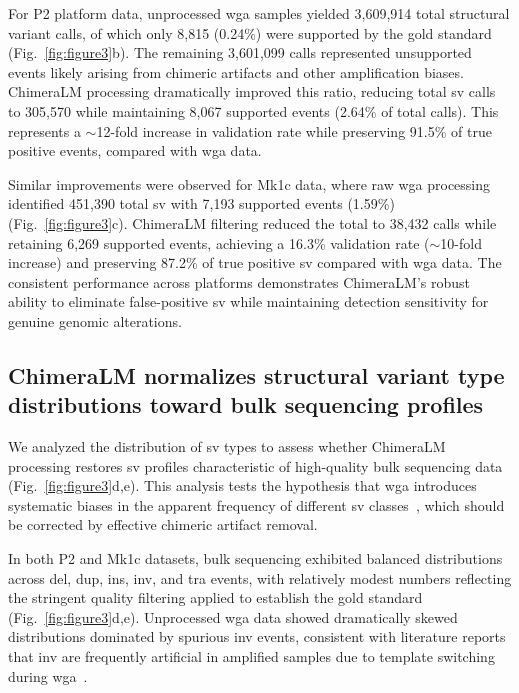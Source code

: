 \documentclass[pdflatex,sn-nature]{sn-jnl}%
\theoremstyle{thmstyleone}%
\theoremstyle{thmstyletwo}%
\theoremstyle{thmstylethree}%
\begin{document}
For P2 platform data, unprocessed \gls{wga} samples yielded 3,609,914 total structural variant calls, of which only 8,815 (0.24\%) were supported by the gold standard (Fig.~\ref{fig:figure3}b).
The remaining 3,601,099 calls represented unsupported events likely arising from chimeric artifacts and other amplification biases.
ChimeraLM processing dramatically improved this ratio, reducing total \gls{sv} calls to 305,570 while maintaining 8,067 supported events (2.64\% of total calls).
This represents a $\sim$12-fold increase in validation rate while preserving 91.5\% of true positive events, compared with \gls{wga} data.

Similar improvements were observed for Mk1c data, where raw \gls{wga} processing identified 451,390 total \gls{sv} with 7,193 supported events (1.59\%) (Fig.~\ref{fig:figure3}c).
ChimeraLM filtering reduced the total to 38,432 calls while retaining 6,269 supported events, achieving a 16.3\% validation rate ($\sim$10-fold increase) and preserving 87.2\% of true positive \gls{sv} compared with \gls{wga} data.
The consistent performance across platforms demonstrates ChimeraLM's robust ability to eliminate false-positive \gls{sv} while maintaining detection sensitivity for genuine genomic alterations.

\subsection*{ChimeraLM normalizes structural variant type distributions toward bulk sequencing profiles}

We analyzed the distribution of \gls{sv} types to assess whether ChimeraLM processing restores \gls{sv} profiles characteristic of high-quality bulk sequencing data (Fig.~\ref{fig:figure3}d,e).
This analysis tests the hypothesis that \gls{wga} introduces systematic biases in the apparent frequency of different \gls{sv} classes~\cite{lu2023chimera, agyabeng2025evaluating}, which should be corrected by effective chimeric artifact removal.

In both P2 and Mk1c datasets, bulk sequencing exhibited balanced distributions across \gls{del}, \gls{dup}, \gls{ins}, \gls{inv}, and \gls{tra} events, with relatively modest numbers reflecting the stringent quality filtering applied to establish the gold standard (Fig.~\ref{fig:figure3}d,e).
Unprocessed \gls{wga} data showed dramatically skewed distributions dominated by spurious \gls{inv} events, consistent with literature reports that \gls{inv} are frequently artificial in amplified samples due to template switching during \gls{wga}~\cite{lu2023exploration, lu2023chimera}.
\end{document}
